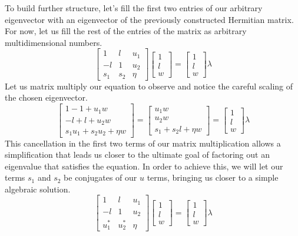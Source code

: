 \documentclass{article}
\theoremstyle{plain}
\begin{document}
To build further structure, let's fill the first two entries of our arbitrary eigenvector with an eigenvector of the previously constructed Hermitian matrix. For now, let us fill the rest of the entries of the matrix as arbitrary multidimensional numbers.
$$
\begin{bmatrix}
1 & l & u_1\\
-l & 1 & u_2\\
s_1 & s_2 & \eta
\end{bmatrix}
\begin{bmatrix}
1\\
l\\
w
\end{bmatrix}
=
\begin{bmatrix}
1\\
l\\
w
\end{bmatrix}\lambda
$$
Let us matrix multiply our equation to observe and notice the careful scaling of the chosen eigenvector.
$$
\begin{bmatrix}
1-1+u_1w\\
-l+l+u_2w\\
s_1u_1+s_2u_2+\eta w
\end{bmatrix}
=
\begin{bmatrix}
u_1w\\
u_2w\\
s_1+s_2l+\eta w
\end{bmatrix}
=
\begin{bmatrix}
1\\
l\\
w
\end{bmatrix}\lambda
$$
This cancellation in the first two terms of our matrix multiplication allows a simplification that leads us closer to the ultimate goal of factoring out an eigenvalue that satisfies the equation. In order to achieve this, we will let our terms $s_1$ and $s_2$ be conjugates of our $u$ terms, bringing us closer to a simple algebraic solution.
$$
\begin{bmatrix}
1 & l & u_1\\
-l & 1 & u_2\\
u_1^* & u_2^* & \eta
\end{bmatrix}
\begin{bmatrix}
1\\
l\\
w
\end{bmatrix}=\begin{bmatrix}
1\\
l\\
w
\end{bmatrix}\lambda
$$
\end{document}
